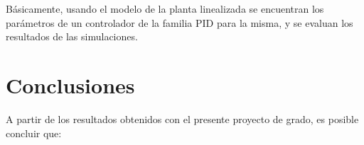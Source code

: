 \documentclass[a4paper,12pt,twoside]{proyectotanquesecci}
\begin{document}

Básicamente, usando el modelo de la planta linealizada se encuentran los parámetros de un controlador de la familia PID para la misma, y se evaluan los resultados de las simulaciones.

















\chapter{Conclusiones}

A partir de los resultados obtenidos con el presente proyecto de grado, es posible concluir que: \\
\end{document}
